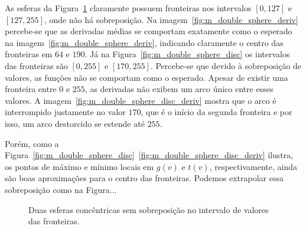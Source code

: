 	As esferas da Figura~\ref{fig:m_double_sphere} claramente possuem fronteiras nos intervalos $ [0,127] $ e $ [127,255] $, onde não há sobreposição. Na imagem~\ref{fig:m_double_sphere_deriv} percebe-se que as derivadas médias se comportam exatamente como o esperado na imagem~\ref{fig:m_double_sphere_deriv}, indicando claramente o centro das fronteiras em $ 64 $ e $ 190 $. Já na Figura~\ref{fig:m_double_sphere_disc} os intervalos das fronteiras são $ [0,255] $ e $ [170,255] $. Percebe-se que devido à sobreposição de valores, as funções não se comportam como o esperado. Apesar de existir uma fronteira entre $ 0 $ e $ 255 $, as derivadas não exibem um arco único entre esses valores. A imagem~\ref{fig:m_double_sphere_disc_deriv} mostra que o arco é interrompido justamente no valor $ 170 $, que é o início da segunda fronteira e por isso, um arco destorcido se estende até $ 255 $.
	
	Porém, como a Figura~\ref{fig:m_double_sphere_disc}~\ref{fig:m_double_sphere_disc_deriv} ilustra, os pontos de máximo e mínimo locais em $ g(v) $ e $ t(v) $, respectivamente, ainda são boas aproximações para o centro das fronteiras. Podemos extrapolar essa sobreposição como na Figura...
	
\begin{figure}[h]
	\centering
	\label{fig:m_double_sphere}
	\caption{Duas esferas concêntricas sem sobreposição no intervalo de valores das fronteiras.}
\end{figure}

